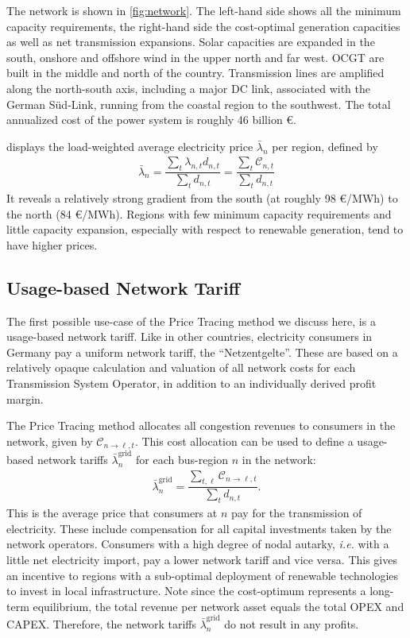 \documentclass[11pt,twocolumn]{article}
\newcommand{\ie}{\textit{i.e.} }
\newcommand{\lmp}[1][n]{\lambda_{#1,t}}
\newcommand{\averagelmp}[1][n]{\bar{\lambda}_{#1}}
\newcommand{\demand}[1][n]{d_{#1,t}}
\newcommand{\cost}{\mathcal{C}}
\newcommand{\payment}[1][n]{\cost_{#1,t}}
\newcommand{\allocatelinecost}[1][n \rightarrow \ell]{\cost_{#1, t}}
\begin{document}
The network is shown in  \cref{fig:network}. The left-hand side shows all the minimum capacity requirements, the right-hand side the cost-optimal generation capacities as well as net transmission expansions. Solar capacities are expanded in the south, onshore and offshore wind in the upper north and far west. \ac{OCGT} are built in the middle and north of the country. Transmission lines are amplified along the north-south axis, including a major \ac{DC} link, associated with the German S\"ud-Link, running from the coastal region to the southwest. 
The total annualized cost of the power system is roughly 46 billion \euro.
% 

 displays the load-weighted average electricity price $\averagelmp$ per region, defined by 
\begin{align}
    \averagelmp = \dfrac{\sum_{t} \lmp \demand}{\sum_t \demand} = \dfrac{\sum_{t} \payment }{\sum_t \demand}    
\end{align}
It reveals a relatively strong gradient from the south (at roughly 98 \euro/MWh) to the north (84 \euro/MWh). Regions with few minimum capacity requirements and little capacity expansion, especially with respect to renewable generation, tend to have higher prices. 
 \\
 
\subsection{Usage-based Network Tariff}

The first possible use-case of the Price Tracing method we discuss here, is a usage-based network tariff. Like in other countries, electricity consumers in Germany pay a uniform network tariff, the ``Netzentgelte''. These are based on a relatively opaque calculation and valuation of all network costs for each Transmission System Operator, in addition to an individually derived profit margin. 

The Price Tracing method allocates all congestion revenues to consumers in the network, given by $\allocatelinecost$. This cost allocation can be used to define a usage-based network tariffs $\averagelmp^\text{grid}$ for each bus-region $n$ in the network:     
\begin{align}
    \averagelmp^\text{grid} = \dfrac{\sum_{t,\ell} \allocatelinecost}{\sum_t \demand}.
\end{align}
This is the average price that consumers at $n$ pay for the transmission of electricity. These include compensation for all capital investments taken by the network operators. Consumers with a high degree of nodal autarky, \ie with a little net electricity import, pay a lower network tariff and vice versa. This gives an incentive to regions with a sub-optimal deployment of renewable technologies to invest in local infrastructure. Note since the cost-optimum represents a long-term equilibrium, the total revenue per network asset equals the total \ac{OPEX} and \ac{CAPEX}. Therefore, the network tariffs $\averagelmp^\text{grid}$ do not result in any profits. 
\end{document}
